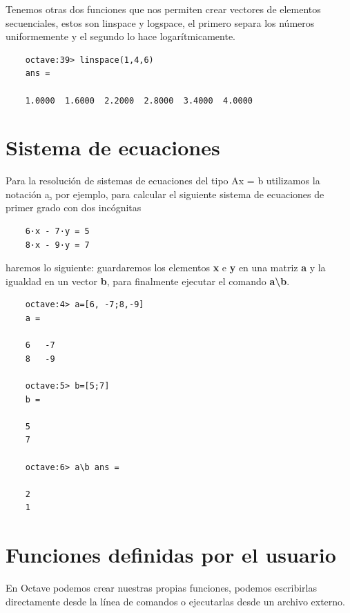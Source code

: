 \documentclass[a4,12pt]{article}
\begin{document}
Tenemos	otras	dos	funciones	que	nos	permiten	crear	vectores	de	elementos secuenciales,  estos  son  linspace y  logspace,  el  primero  separa  los  números uniformemente y el segundo lo hace logarítmicamente.

\begin{verbatim}
	octave:39> linspace(1,4,6)
	ans =

	1.0000	1.6000	2.2000	2.8000	3.4000	4.0000
\end{verbatim}

\section{Sistema de ecuaciones}

Para la resolución de sistemas de ecuaciones del tipo Ax = b utilizamos la notación a\b, por ejemplo, para calcular el siguiente sistema de ecuaciones de primer grado con dos incógnitas
\begin{verbatim}
    6·x - 7·y = 5
    8·x - 9·y = 7
\end{verbatim}
haremos lo siguiente: guardaremos los elementos \textbf{x} e \textbf{y} en una matriz \textbf{a} y la igualdad en un vector \textbf{b}, para finalmente ejecutar el comando \textbf{a\textbackslash b}.
\begin{verbatim}
    octave:4> a=[6, -7;8,-9]
    a =

    6	-7
    8	-9
    
    octave:5> b=[5;7]
    b =

    5
    7

    octave:6> a\b ans =

    2
    1
\end{verbatim}

\section{Funciones definidas por el usuario}

En Octave podemos crear nuestras propias funciones, podemos escribirlas directamente desde la línea de comandos o ejecutarlas desde un archivo externo.
\end{document}
